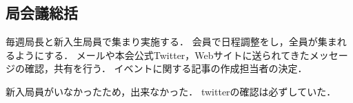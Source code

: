 \subsection*{局会議総括}



毎週局長と新入生局員で集まり実施する．
会員で日程調整をし，全員が集まれるようにする．
メールや本会公式Twitter，Webサイトに送られてきたメッセージの確認，共有を行う．
イベントに関する記事の作成担当者の決定．

新入局員がいなかったため，出来なかった．
twitterの確認は必ずしていた．
